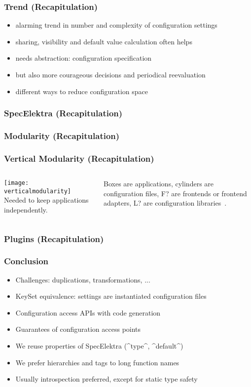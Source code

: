 \begin{frame}[fragile]
	\frametitle{Trend (Recapitulation)}
	\pause

	\begin{itemize}
	\item alarming trend in number and complexity of configuration settings
	\item sharing, visibility and default value calculation often helps
	\item needs abstraction: configuration specification
	\item but also more courageous decisions and periodical reevaluation
	\item different ways to reduce configuration space
	\end{itemize}
\end{frame}

\begin{frame}
	\frametitle{SpecElektra (Recapitulation)}
	\pause

	\fontsize{18}{0}\selectfont
\end{frame}


\begin{frame}
	\frametitle{Modularity (Recapitulation)}
	\pause
	\Large
\end{frame}

\begin{frame}
	\frametitle{Vertical Modularity (Recapitulation)}
	\begin{columns}[c]
	\column{7cm}
	\texttt{[image: verticalmodularity]}
	\column{4cm}
	Needed to keep applications independently.

	Boxes are applications, cylinders are configuration files, F? are frontends or frontend adapters, L? are configuration libraries~\cite{raab2016improving}.
	\end{columns}
\end{frame}


\begin{frame}
	\frametitle{Plugins (Recapitulation)}
	\pause
	\Large
\end{frame}

\begin{frame}[fragile]
	\frametitle{Conclusion}
	\begin{itemize}
	\item Challenges: duplications, transformations, ...
	\item KeySet equivalence: settings are instantiated configuration files
	\item Configuration access APIs with code generation
	\item Guarantees of configuration access points
	\item We reuse properties of SpecElektra (^type^, ^default^)
	\item We prefer hierarchies and tags to long function names
	\item Usually introspection preferred, except for static type safety
	\end{itemize}
\end{frame}


